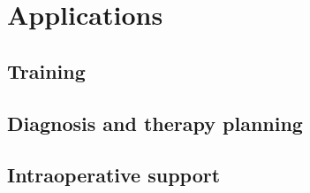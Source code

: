 \chapter{Applications}
\label{Applications}

\section{Training}

\section{Diagnosis and therapy planning}

\section{Intraoperative support}
